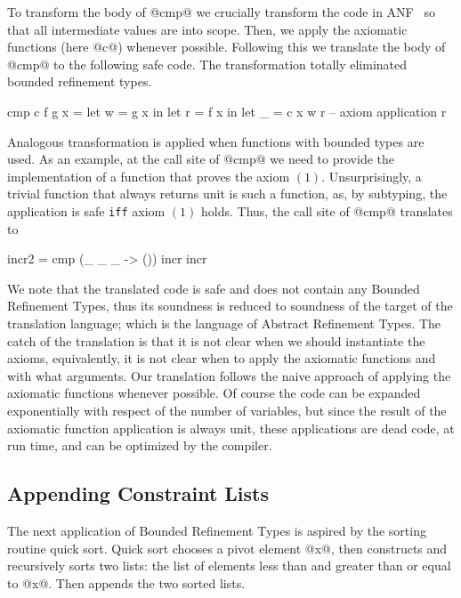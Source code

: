 To transform the body of @cmp@ we crucially transform the code in ANF~\citep{}
so that all intermediate values are into scope.
%
Then, we apply the axiomatic functions (here @c@) whenever possible.
% 
Following this we translate the body of @cmp@ to the following safe code.
The transformation totally eliminated bounded refinement types.
%
\begin{code}
cmp c f g x 
  = let w = g x in 
     let r  = f x   in
     let _ = c x w r -- axiom application
     r   
\end{code}

Analogous transformation is applied when functions with bounded types are used.
As an example, at the call site of @cmp@ we need to provide the implementation of a function
that proves the axiom $(1)$. 
%
Unsurprisingly, a trivial function that always returns unit is such a function, 
as, by subtyping, the application is safe \texttt{iff} axiom $(1)$ holds. 
%
Thus, the call site of @cmp@ translates to 
\begin{code}
incr2 = cmp (\_ _ _ -> ()) incr incr
\end{code}

We note that the translated code is safe and does not contain any Bounded Refinement Types, 
thus its soundness is reduced to soundness of the target of the translation language; 
which is the language of Abstract Refinement Types.
%
The catch of the translation is that it is not clear when we should instantiate the axioms, 
equivalently, it is not clear when to apply the axiomatic functions and with what arguments.
%
Our translation follows the naive approach of applying the axiomatic functions whenever possible.
%
Of course the code can be expanded exponentially with respect of the number of variables, 
but since the result of the axiomatic function application is always unit, 
these applications are dead code, at run time, and can be optimized by the compiler. 


\subsection{Appending Constraint Lists}
The next application of Bounded Refinement Types is aspired by
the sorting routine quick sort.
%
Quick sort chooses a pivot element @x@,
then constructs and recursively sorts two lists:
the list of elements less than and greater than or equal to @x@.
%
Then appends the two sorted lists. 
%

